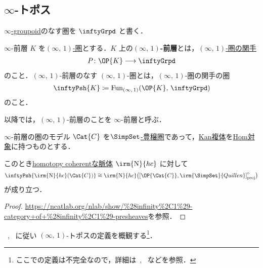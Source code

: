 \documentclass[TQFT_main]{subfiles}
\begin{document}
\subsection{$\infty$-トポス}

\hyperref[def:infinity-1]{$\infty$-groupoid}のなす圏を $\inftyGrpd$ と書く．

\begin{mydef}[label=def:infinity-presheaf]{$\infty$-前層}
    $K$ を\hyperref[def:infinity-1]{$(\infty,\, 1)$-圏}とする．$K$ 上の\textbf{$(\infty,\, 1)$-前層}とは，\hyperref[def:infinity-1]{$(\infty,\, 1)$-圏の関手}
    \begin{align}
        P \colon \OP{K} \lto \inftyGrpd
    \end{align}
    のこと．$(\infty,\, 1)$-前層のなす $(\infty,\, 1)$-圏とは，$(\infty,\, 1)$-圏の関手の圏
    \begin{align}
        \inftyPsh{K} \coloneqq \mathrm{Fun}_{(\infty,\, 1)} (\OP{K},\, \inftyGrpd)
    \end{align}
    のこと．
\end{mydef}

\begin{marker}
    以降では，$(\infty,\, 1)$-前層のことを $\infty$-前層と呼ぶ．
\end{marker}


\begin{myprop}[label=prop:nerve-Psh]{$\infty$-前層の圏のモデル}
    $\Cat{C}$ を\hyperref[def:enriched]{$\SimpSet$-豊穣圏}であって，\hyperref[def:KanCplx]{Kan複体}を\hyperref[def:enriched]{Hom対象}に持つものとする．
    
    このとき\hyperref[def:nerve-hc]{homotopy coherentな脈体} $\irm{\mathrm{N}}{hc}$ に対して
    \begin{align}
        \inftyPsh{\irm{\mathrm{N}}{hc}(\Cat{C})} \cong \irm{\mathrm{N}}{hc} \bigl( \comm{\OP{\Cat{C}}}{\irm{\SimpSet}{Quillen}}_{\mathrm{proj}}^\circ \bigr)
    \end{align}
    が成り立つ．
\end{myprop}

\begin{proof}
    \url{https://ncatlab.org/nlab/show/%28infinity%2C1%29-category+of+%28infinity%2C1%29-presheaves}を参照．
\end{proof}

~\cite{nLab}, ~\cite[p.9]{NSS2012}に従い $(\infty,\, 1)$-トポスの定義を概観する\footnote{ここでの定義は不完全なので，詳細は~\cite{nLab}, ~\cite{lurie2008higher}などを参照．}．
\end{document}
